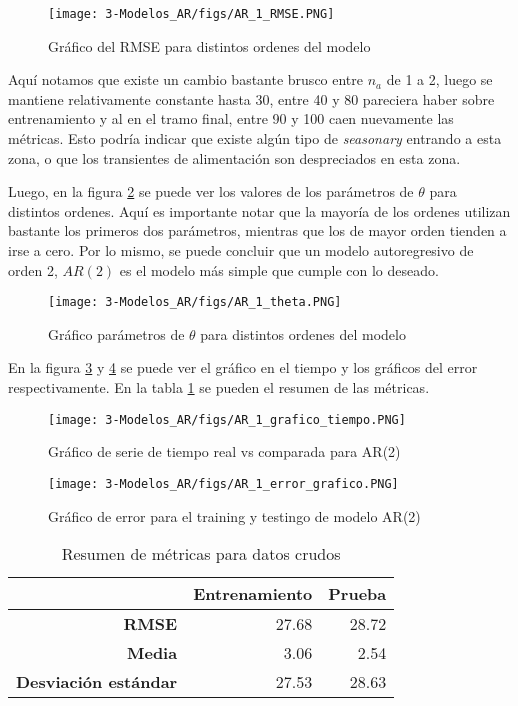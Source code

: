 \begin{figure}[H]
	\centering
	\texttt{[image: 3-Modelos\_AR/figs/AR\_1\_RMSE.PNG]}
	\caption{Gráfico del RMSE para distintos ordenes del modelo}
	\label{fig:M3_AR1_RMSE}
\end{figure}

Aquí notamos que existe un cambio bastante brusco entre $n_a$ de 1 a 2, luego se mantiene relativamente constante hasta 30, entre 40 y 80 pareciera haber sobre entrenamiento y al en el tramo final, entre 90 y 100 caen nuevamente las métricas. Esto podría indicar que existe algún tipo de \emph{seasonary} entrando a esta zona, o que los transientes de alimentación son despreciados en esta zona.


Luego, en la figura \ref{fig:M3_AR1_theta} se puede ver los valores de los parámetros de $\theta$ para distintos ordenes. Aquí es importante notar que la mayoría de los ordenes utilizan bastante los primeros dos parámetros, mientras que los de mayor orden tienden a irse a cero. Por lo mismo, se puede concluir que un modelo autoregresivo de orden 2, $AR(2)$ es el modelo más simple que cumple con lo deseado.

\begin{figure}[H]
	\centering
	\texttt{[image: 3-Modelos\_AR/figs/AR\_1\_theta.PNG]}
	\caption{Gráfico parámetros de $\theta$ para distintos ordenes del modelo}
	\label{fig:M3_AR1_theta}
\end{figure}

En la figura \ref{fig:M3_AR1_grafico_tiempo} y \ref{fig:M3_AR1_grafico_error} se puede ver el gráfico en el tiempo y los gráficos del error respectivamente. En la tabla \ref{table:M3_AR1_metricas} se pueden el resumen de las métricas.


\begin{figure}[H]
	\centering
	\texttt{[image: 3-Modelos\_AR/figs/AR\_1\_grafico\_tiempo.PNG]}
	\caption{Gráfico de serie de tiempo real vs comparada para AR(2)}
	\label{fig:M3_AR1_grafico_tiempo}
\end{figure}

\begin{figure}[H]
	\centering
	\texttt{[image: 3-Modelos\_AR/figs/AR\_1\_error\_grafico.PNG]}
	\caption{Gráfico de error para el training y testingo de modelo AR(2)}
	\label{fig:M3_AR1_grafico_error}
\end{figure}


\begin{table}[H]
	\centering
	\begin{tabular}{rr|r}
		\hline \hline
		&	Entrenamiento & Prueba \\
		\hline
		\textbf{RMSE}   				& 27.68 & 28.72 \\
		\textbf{Media}     				& 3.06  & 2.54  \\
		\textbf{Desviación estándar} 	& 27.53 & 28.63 \\ 
		\hline \hline
	\end{tabular}
	\caption{Resumen de métricas para datos crudos}
	\label{table:M3_AR1_metricas}
\end{table}






